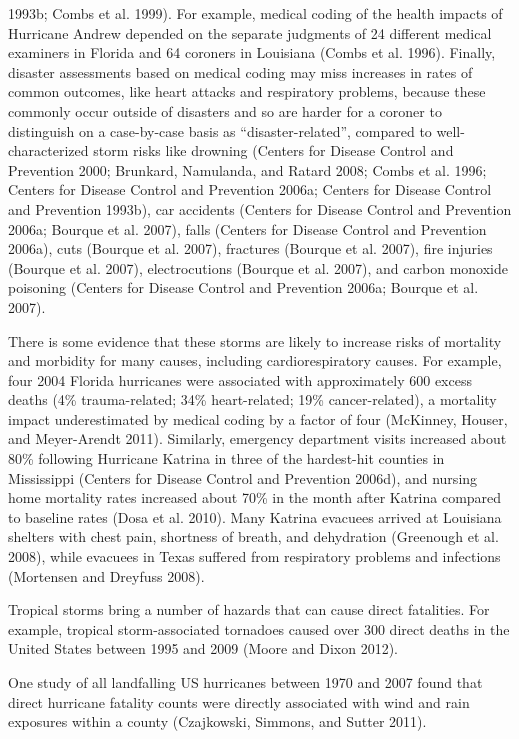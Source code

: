 \documentclass[]{elsarticle} %
\begin{document}
1993b; Combs et al. 1999). For example, medical coding of the health
impacts of Hurricane Andrew depended on the separate judgments of 24
different medical examiners in Florida and 64 coroners in Louisiana
(Combs et al. 1996). Finally, disaster assessments based on medical
coding may miss increases in rates of common outcomes, like heart
attacks and respiratory problems, because these commonly occur outside
of disasters and so are harder for a coroner to distinguish on a
case-by-case basis as ``disaster-related'', compared to
well-characterized storm risks like drowning (Centers for Disease
Control and Prevention 2000; Brunkard, Namulanda, and Ratard 2008; Combs
et al. 1996; Centers for Disease Control and Prevention 2006a; Centers
for Disease Control and Prevention 1993b), car accidents (Centers for
Disease Control and Prevention 2006a; Bourque et al. 2007), falls
(Centers for Disease Control and Prevention 2006a), cuts (Bourque et al.
2007), fractures (Bourque et al. 2007), fire injuries (Bourque et al.
2007), electrocutions (Bourque et al. 2007), and carbon monoxide
poisoning (Centers for Disease Control and Prevention 2006a; Bourque et
al. 2007).

There is some evidence that these storms are likely to increase risks of
mortality and morbidity for many causes, including cardiorespiratory
causes. For example, four 2004 Florida hurricanes were associated with
approximately 600 excess deaths (4\% trauma-related; 34\% heart-related;
19\% cancer-related), a mortality impact underestimated by medical
coding by a factor of four (McKinney, Houser, and Meyer-Arendt 2011).
Similarly, emergency department visits increased about 80\% following
Hurricane Katrina in three of the hardest-hit counties in Mississippi
(Centers for Disease Control and Prevention 2006d), and nursing home
mortality rates increased about 70\% in the month after Katrina compared
to baseline rates (Dosa et al. 2010). Many Katrina evacuees arrived at
Louisiana shelters with chest pain, shortness of breath, and dehydration
(Greenough et al. 2008), while evacuees in Texas suffered from
respiratory problems and infections (Mortensen and Dreyfuss 2008).

Tropical storms bring a number of hazards that can cause direct
fatalities. For example, tropical storm-associated tornadoes caused over
300 direct deaths in the United States between 1995 and 2009 (Moore and
Dixon 2012).

One study of all landfalling US hurricanes between 1970 and 2007 found
that direct hurricane fatality counts were directly associated with wind
and rain exposures within a county (Czajkowski, Simmons, and Sutter
2011).
\end{document}
